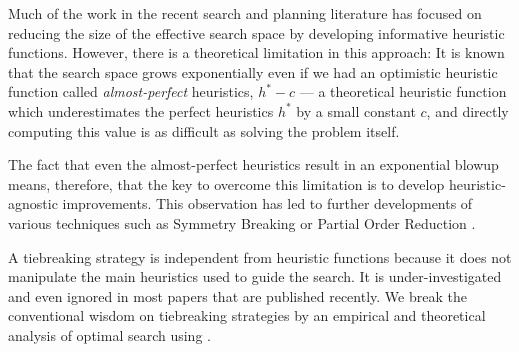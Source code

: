 Much of the work in the recent search and planning literature has focused on
reducing the size of the effective search space by developing
informative heuristic functions. However, there is a theoretical
limitation in this approach: It is known that the search space grows
exponentially even if we had an optimistic
heuristic function called \emph{almost-perfect} heuristics,
$h^*-c$ \cite{helmert2008good} --- a
theoretical heuristic function which
underestimates the perfect heuristics $h^*$ by a small constant
$c$, and directly computing this value is as difficult as solving the
problem itself.

The fact that even the almost-perfect heuristics result in an exponential
blowup means, therefore, that the key to overcome this limitation is
to develop heuristic-agnostic improvements. This observation has
led to further developments of various techniques such as Symmetry Breaking
\cite{Fox1998,pochter2011exploiting,domshlak2013symmetry} or Partial
Order Reduction \cite{hall2013faster,wehrle2013relative}.

A tiebreaking strategy is
independent from heuristic functions because it does not manipulate the
main heuristics used to guide the search. It is under-investigated
and even ignored in most papers that are published recently.
We break the conventional wisdom on tiebreaking strategies by an
empirical and theoretical analysis of optimal search using \astar.
